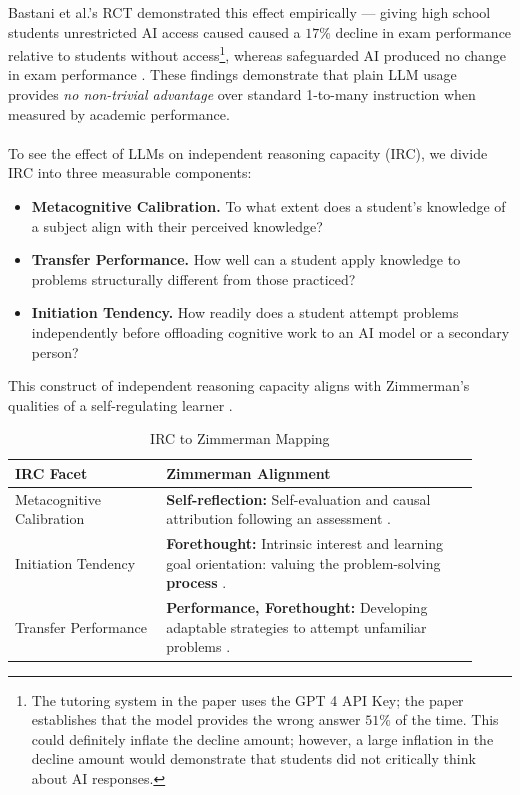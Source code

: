 \documentclass[12pt]{article}
\begin{document}
 Bastani et al.'s RCT demonstrated this effect empirically --- giving high school students unrestricted AI access caused caused a $17\%$ decline in exam performance relative to students without access\footnote{The tutoring system in the paper uses the GPT 4 API Key; the paper establishes that the model provides the wrong answer $51\%$ of the time. This could definitely inflate the decline amount; however, a large inflation in the decline amount would demonstrate that students did not critically think about AI responses.}, whereas safeguarded AI produced no change in exam performance \cite{doi:10.1073/pnas.2422633122}. These findings demonstrate that plain LLM usage provides \emph{no non-trivial advantage} over standard 1-to-many instruction when measured by academic performance.
 \\\\
 To see the effect of LLMs on independent reasoning capacity (IRC), we divide IRC into three measurable components:
 \begin{itemize}
     \item \textbf{Metacognitive Calibration.} To what extent does a student's knowledge of a subject align with their perceived knowledge?
     \item \textbf{Transfer Performance.} How well can a student apply knowledge to problems structurally different from those practiced?
     \item \textbf{Initiation Tendency.} How readily does a student attempt problems independently before offloading cognitive work to an AI model or a secondary person?
 \end{itemize}

This construct of independent reasoning capacity aligns with Zimmerman's qualities of a self-regulating learner \cite{Zimmerman2000}.

\begin{table}[H]
\centering
\caption{IRC to Zimmerman Mapping}
\label{tab:zimmerman_mapping}
\renewcommand{\arraystretch}{1.2}
\begin{tabular}{p{0.30\linewidth} p{0.62\linewidth}}
\toprule
\textbf{IRC Facet} & \textbf{Zimmerman Alignment} \\
\midrule
Metacognitive Calibration &
\textbf{Self-reflection:} Self-evaluation and causal attribution following an assessment \cite{Zimmerman2000}. \\
\midrule
Initiation Tendency &
\textbf{Forethought:} Intrinsic interest and learning goal orientation: valuing the problem-solving \textbf{process} \cite{Zimmerman2000}. \\
\midrule
Transfer Performance &
\textbf{Performance, Forethought:} Developing adaptable strategies to attempt unfamiliar problems \cite{Zimmerman2000}. \\
\bottomrule
\end{tabular}
\end{table}
\end{document}
